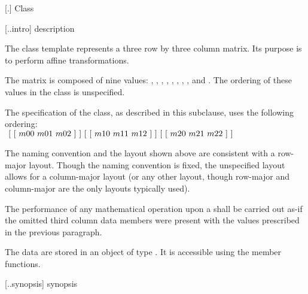  [\iotwod.\matrixtwod] {Class }

 [\iotwod.\matrixtwod.intro] { description}

%
\pnum
The class template  represents a three row by three column matrix. Its purpose is to perform affine transformations.

\pnum
The matrix is composed of nine  values: , , , , , , , , and . The ordering of these  values in the  class is unspecified.

\pnum
The specification of the  class, as described in this subclause, uses the following ordering: \\
$
~[~[~m00~m01~m02~]~] \\
~[~[~m10~m11~m12~]~] \\
~[~[~m20~m21~m22~]~]$

\pnum
\begin{note}
The naming convention and the layout shown above are consistent with a row-major layout. Though the naming convention is fixed, the unspecified layout allows for a column-major layout (or any other layout, though row-major and column-major are the only layouts typically used).
\end{note}

\pnum
The performance of any mathematical operation upon a  shall be carried out as-if the omitted third column data members were present with the values prescribed in the previous paragraph.

\pnum
The data are stored in an object of type . It is accessible using the  member functions.

 [\iotwod.\matrixtwod.synopsis] { synopsis}

